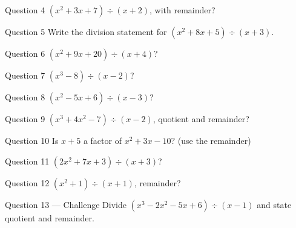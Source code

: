 \documentclass[11pt]{article}
\begin{document}
\begin{qbox}{Question 4}
$(x^2+3x+7)\div(x+2)$, with remainder?\workspace{2.4cm}
\end{qbox}

\begin{qbox}{Question 5}
Write the division statement for $(x^2+8x+5)\div(x+3)$.\workspace{2.4cm}
\end{qbox}

\begin{qbox}{Question 6}
$(x^2+9x+20)\div(x+4)$?\workspace{2.4cm}
\end{qbox}

\begin{qbox}{Question 7}
$(x^3-8)\div(x-2)$?\workspace{2.4cm}
\end{qbox}

\begin{qbox}{Question 8}
$(x^2-5x+6)\div(x-3)$?\workspace{2.4cm}
\end{qbox}

\begin{qbox}{Question 9}
$(x^3+4x^2-7)\div(x-2)$, quotient and remainder?\workspace{2.4cm}
\end{qbox}

\begin{qbox}{Question 10}
Is $x+5$ a factor of $x^2+3x-10$? (use the remainder)\workspace{2.4cm}
\end{qbox}

\begin{qbox}{Question 11}
$(2x^2+7x+3)\div(x+3)$?\workspace{2.4cm}
\end{qbox}

\begin{qbox}{Question 12}
$(x^2+1)\div(x+1)$, remainder?\workspace{2.4cm}
\end{qbox}

\begin{qbox}{Question 13 --- Challenge}
Divide $(x^3-2x^2-5x+6)\div(x-1)$ and state quotient and remainder.\workspace{3.5cm}
\end{qbox}

\clearpage
{}
\end{document}
